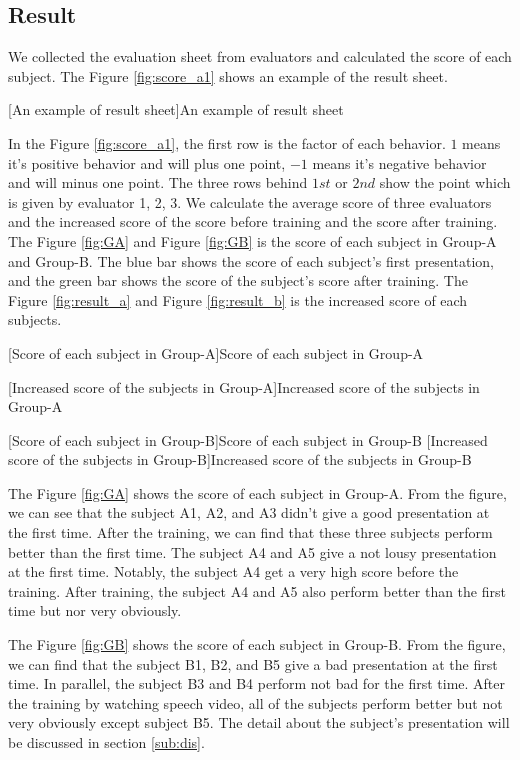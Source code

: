 \subsection*{Result}
\par We collected the evaluation sheet from evaluators and calculated the score of each subject. The Figure \ref{fig:score_a1} shows an example of the result sheet. 

[An example of result sheet]{An example of result sheet}

 \par In the Figure \ref{fig:score_a1}, the first row is the factor of each behavior. $1$ means it's positive behavior and will plus one point, $-1$ means it's negative behavior and will minus one point. The three rows behind $1st$ or $2nd$ show the point which is given by evaluator 1, 2, 3. We calculate the average score of three evaluators and the increased score of the score before training and the score after training. The Figure \ref{fig:GA} and Figure \ref{fig:GB} is the score of each subject in Group-A and Group-B. The blue bar shows the score of each subject's first presentation, and the green bar shows the score of the subject's score after training. The Figure \ref{fig:result_a} and Figure \ref{fig:result_b} is the increased score of each subjects. 

[Score of each subject in Group-A]{Score of each subject in Group-A}

[Increased score of the subjects in Group-A]{Increased score of the subjects in Group-A}

\newpage
{}[Score of each subject in Group-B]{Score of each subject in Group-B}
[Increased score of the subjects in Group-B]{Increased score of the subjects in Group-B}
\par The Figure \ref{fig:GA} shows the score of each subject in Group-A. From the figure, we can see that the subject A1, A2, and A3 didn't give a good presentation at the first time. After the training, we can find that these three subjects perform better than the first time. The subject A4 and A5 give a not lousy presentation at the first time. Notably, the subject A4 get a very high score before the training. After training, the subject A4 and A5 also perform better than the first time but nor very obviously.

\par The Figure \ref{fig:GB} shows the score of each subject in Group-B. From the figure, we can find that the subject B1, B2, and B5 give a bad presentation at the first time. In parallel, the subject B3 and B4 perform not bad for the first time. After the training by watching speech video, all of the subjects perform better but not very obviously except subject B5. The detail about the subject's presentation will be discussed in section \ref{sub:dis}.


